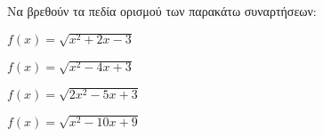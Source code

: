 Να βρεθούν τα πεδία ορισμού των παρακάτω συναρτήσεων:
\begin{alist}
\item $ f(x)=\sqrt{x^2+2x-3} $
\item $ f(x)=\sqrt{x^2-4x+3} $
\item $ f(x)=\sqrt{2x^2-5x+3} $
\item $ f(x)=\sqrt{x^2-10x+9} $
\end{alist}
